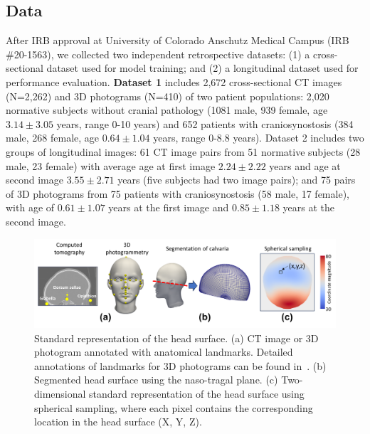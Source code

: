 \documentclass[conference]{IEEEtran}
\begin{document}
\subsection{Data}
After IRB approval at University of Colorado Anschutz Medical Campus (IRB \#20-1563), we collected two independent retrospective datasets: (1) a cross-sectional dataset used for model training; and (2) a longitudinal dataset used for performance evaluation. \textbf{Dataset 1} includes 2,672 cross-sectional CT images (N=2,262) and 3D photograms (N=410) of two patient populations: 2,020 normative subjects without cranial pathology (1081 male, 939 female, age $3.14 \pm 3.05$ years, range 0-10 years) and 652 patients with craniosynostosis (384 male, 268 female, age $0.64 \pm 1.04$ years, range 0-8.8 years). Dataset 2 includes two groups of longitudinal images: 61 CT image pairs from 51 normative subjects (28 male, 23 female) with average age at first image $2.24 \pm 2.22$ years and age at second image $3.55 \pm 2.71$ years (five subjects had two image pairs); and 75 pairs of 3D photograms from 75 patients with craniosynostosis (58 male, 17 female), with age of $0.61 \pm 1.07$ years at the first image and $0.85 \pm 1.18$ years at the second image.
\vspace{-1mm}
\begin{figure}[!b]
\centering
\includegraphics[width=\columnwidth]{figures/StandardizedRepresentation.png}
\caption{Standard representation of the head surface. (a) CT image or 3D photogram annotated with anatomical landmarks. Detailed annotations of landmarks for 3D photograms can be found in~\cite{Elkhill2023Geometric}. (b) Segmented head surface using the naso-tragal plane. (c) Two-dimensional standard representation of the head surface using spherical sampling, where each pixel contains the corresponding location in the head surface (X, Y, Z).}
\label{fig:standard}
\end{figure}
\end{document}
